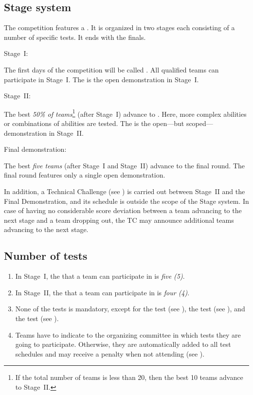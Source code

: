 \subsection{Stage system}\label{rule:stages}

The competition features a . 
It is organized in two stages each consisting of a number of specific tests. 
It ends with the finals.

\begin{enumerate}
{\bf\item Stage~I:} The first days of the competition will be called . 
  All qualified teams can participate in Stage~I. 
  The  is the open demonstration in Stage~I.
{\bf\item Stage~II:} The best \emph{50\% of teams}\footnote{If the total number of teams is less than 20, then the best 10 teams advance to Stage~II.} (after Stage~I) advance to . 
  Here, more complex abilities or combinations of abilities are tested. 
  The  is the open---but scoped---demonstration in Stage~II.
{\bf\item Final demonstration:} The best \emph{five teams} (after Stage~I and Stage~II) advance 
  to the final round. 
  The final round features only a single open demonstration.
\end{enumerate}
In addition, a Technical Challenge (see ) is carried out between Stage~II and the Final Demonstration, and its
schedule is outside the scope of the Stage system.
In case of having no considerable score deviation between a team advancing to 
the next stage and a team dropping out, the TC may announce additional teams advancing to the next stage.


\subsection{Number of tests}\label{rule:number_of_tests}

\begin{enumerate}
\item In Stage~I, the  that a team can participate in is \emph{five (5)}.
\item In Stage~II, the  that a team can participate in is \emph{four (4)}.
\item None of the tests is mandatory, except for the  test (see ), the  test (see ), and the  test (see ).
\item Teams have to indicate to the organizing committee in which tests they are going to participate. 
  Otherwise, they are automatically added to all test schedules and 
  may receive a penalty when not attending (see ).
\end{enumerate}


